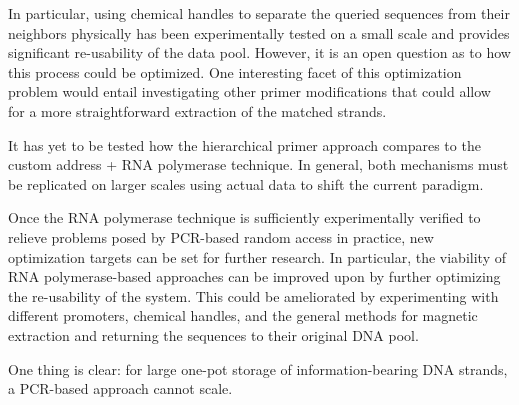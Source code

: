 \documentclass[a4paper,conference]{IEEEtran}
\begin{document}
In particular, using chemical handles to separate the queried sequences from their neighbors physically has been experimentally tested on a small scale and provides significant re-usability of the data pool. However, it is an open question as to how this process could be optimized. One interesting facet of this optimization problem would entail investigating other primer modifications that could allow for a more straightforward extraction of the matched strands.

It has yet to be tested how the hierarchical primer approach compares to the custom address + RNA polymerase technique. In general, both mechanisms must be replicated on larger scales using actual data to shift the current paradigm.

Once the RNA polymerase technique is sufficiently experimentally verified to relieve problems posed by PCR-based random access in practice, new optimization targets can be set for further research. In particular, the viability of RNA polymerase-based approaches can be improved upon by further optimizing the re-usability of the system. This could be ameliorated by experimenting with different promoters, chemical handles, and the general methods for magnetic extraction and returning the sequences to their original DNA pool. 

One thing is clear: for large one-pot storage of information-bearing DNA strands, a PCR-based approach cannot scale. 



\end{document}
